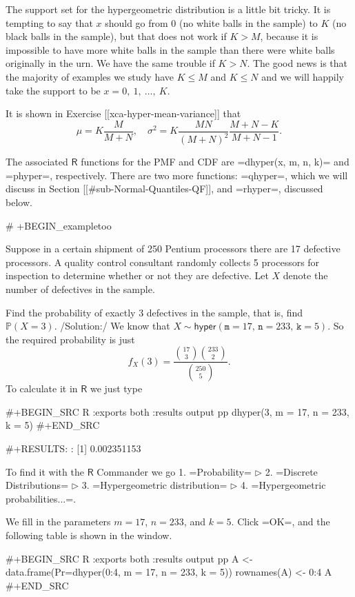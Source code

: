 {The support set for the hypergeometric distribution is a little bit
tricky. It is tempting to say that \(x\) should go from 0 (no white
balls in the sample) to \(K\) (no black balls in the sample), but that
does not work if \(K>M\), because it is impossible to have more white
balls in the sample than there were white balls originally in the
urn. We have the same trouble if \(K>N\). The good news is that the
majority of examples we study have \(K\leq M\) and \(K\leq N\) and we
will happily take the support to be \(x=0,\ 1,\ \ldots,\ K\).

It is shown in Exercise [[xca-hyper-mean-variance]] that
\begin{equation}
\mu=K\frac{M}{M+N},\quad \sigma^{2}=K\frac{MN}{(M+N)^{2}}\frac{M+N-K}{M+N-1}.
\end{equation}

The associated \(\mathsf{R}\) functions for the PMF and CDF are
=dhyper(x, m, n, k)= and =phyper=, respectively. There are two more
functions: =qhyper=, which we will discuss in Section
[[#sub-Normal-Quantiles-QF]], and =rhyper=, discussed below.

# +BEGIN_exampletoo

Suppose in a certain shipment of 250 Pentium processors there are 17
defective processors. A quality control consultant randomly collects 5
processors for inspection to determine whether or not they are
defective. Let \(X\) denote the number of defectives in the sample.

Find the probability of exactly 3 defectives in the sample, that is,
find \(\mathbb{P}(X=3)\).  /Solution:/ We know that
\(X\sim\mathsf{hyper}(\mathtt{m}=17,\,\mathtt{n}=233,\,\mathtt{k}=5)\). So
the required probability is just \[ f_{X}(3)=\frac{{17 \choose 3}{233
\choose 2}}{{250 \choose 5}}.  \] To calculate it in \(\mathsf{R}\) we
just type

#+BEGIN_SRC R :exports both :results output pp  
dhyper(3, m = 17, n = 233, k = 5)
#+END_SRC

#+RESULTS:
: [1] 0.002351153

To find it with the \(\mathsf{R}\) Commander we go 
1. =Probability= \(\triangleright\) 
2. =Discrete Distributions= \(\triangleright\) 
3. =Hypergeometric distribution= \(\triangleright\) 
4. =Hypergeometric probabilities...=. 

We fill in the parameters \(m = 17\), \(n = 233\), and \(k =
5\). Click =OK=, and the following table is shown in the window.

#+BEGIN_SRC R :exports both :results output pp  
A <- data.frame(Pr=dhyper(0:4, m = 17, n = 233, k = 5))
rownames(A) <- 0:4 
A
#+END_SRC

}
